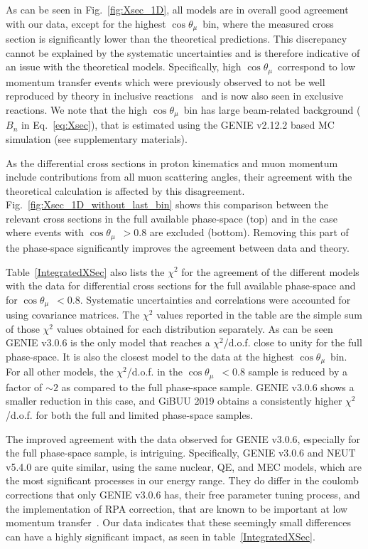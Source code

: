 \documentclass[aps,prl,showpacs,twocolumn,superscriptaddress,letterpaper,longbibliography]{revtex4-1}
\newcommand{\CosThetaMu}{$\cos\theta_{\mu}$}
\begin{document}
As can be seen in Fig.~\ref{fig:Xsec_1D}, all models are in overall good agreement with our data, except for the highest \CosThetaMu\ bin, where the measured cross 
section is significantly lower than the theoretical predictions.
This discrepancy cannot be explained 
by the systematic uncertainties and is therefore indicative of an issue with the theoretical models. 
Specifically, high \CosThetaMu\ correspond to low momentum transfer events which were previously observed to not be well reproduced by theory in inclusive reactions~\cite{Abratenko:2019jqo,Carneiro:2019jds} and is now also seen in exclusive reactions.
We note that the high \CosThetaMu\ bin has large beam-related background ($B_n$ in Eq.~\ref{eq:Xsec}), that is estimated using the GENIE v2.12.2 based MC simulation (see supplementary materials).

As the differential cross sections in proton kinematics and muon momentum include contributions from all muon scattering angles, their agreement with the theoretical calculation is affected by this disagreement. Fig.~\ref{fig:Xsec_1D_without_last_bin} shows this comparison between the relevant cross sections in the full available phase-space (top) and in the case where events with \CosThetaMu\ $ > 0.8$ are excluded (bottom).  Removing this part of the phase-space significantly improves the agreement between data and theory. 

Table~\ref{IntegratedXSec} also lists the $\chi^2$  for the agreement of the different models with the data for differential cross sections for the full available phase-space and for \CosThetaMu\ $ < 0.8$. Systematic uncertainties and correlations were accounted for using covariance matrices.  The $\chi^2$ values reported in the table are the simple sum of those $\chi^2$ values obtained for each distribution separately.  
As can be seen GENIE v3.0.6 is the only model that reaches a $\chi^2$/d.o.f. close to unity for the full phase-space.
It is also the closest model to the data at the highest \CosThetaMu\ bin.
For all other models, the $\chi^2$/d.o.f. in the \CosThetaMu\ $ < 0.8$ sample is reduced by a factor of $\sim 2$ as compared to the full phase-space sample. 
GENIE v3.0.6 shows a smaller reduction in this case, 
and GiBUU 2019 obtains a consistently higher $\chi^2$/d.o.f. for both the full and limited phase-space samples.

The improved agreement with the data observed for GENIE v3.0.6, especially for the full phase-space sample, is intriguing. 
Specifically, GENIE v3.0.6 and NEUT v5.4.0 are quite similar, using the same nuclear, QE, and MEC models, 
which are the most significant processes in our energy range.
They do differ in the coulomb corrections that only GENIE v3.0.6 has, their free parameter tuning process, 
and the implementation of RPA correction, that are known to be important at low momentum transfer~\cite{RPA}.
Our data indicates that these seemingly small differences can have a highly significant impact, as seen in table~\ref{IntegratedXSec}.
\end{document}
